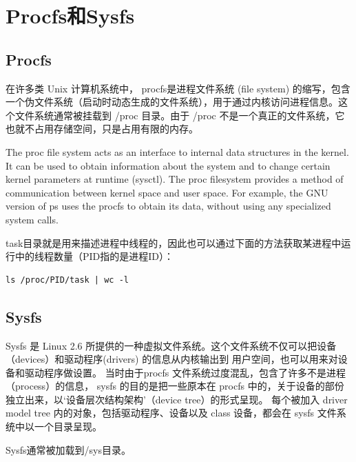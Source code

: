 \section{Procfs和Sysfs}

\subsection{Procfs}
在许多类 Unix 计算机系统中， procfs是进程文件系统 (file system) 的缩写，包含一个伪文件系统（启动时动态生成的文件系统），用于通过内核访问进程信息。这个文件系统通常被挂载到 /proc 目录。由于 /proc 不是一个真正的文件系统，它也就不占用存储空间，只是占用有限的内存。

The proc file system acts as an interface to internal data structures in the kernel. It can be used to obtain information about the system and to change certain kernel parameters at runtime (sysctl).
The proc filesystem provides a method of communication between kernel space and user space. For example, the GNU version of ps uses the procfs to obtain its data, without using any specialized system calls.

task目录就是用来描述进程中线程的，因此也可以通过下面的方法获取某进程中运行中的线程数量（PID指的是进程ID）：
\begin{verbatim}
ls /proc/PID/task | wc -l
\end{verbatim}  


\subsection{Sysfs}
Sysfs 是 Linux 2.6 所提供的一种虚拟文件系统。这个文件系统不仅可以把设备（devices）和驱动程序(drivers) 的信息从内核输出到 用户空间，也可以用来对设备和驱动程序做设置。
当时由于procfs 文件系统过度混乱，包含了许多不是进程（process）的信息， sysfs 的目的是把一些原本在 procfs 中的，关于设备的部份独立出来，以‘设备层次结构架构’（device tree）的形式呈现。
每个被加入 driver model tree 内的对象，包括驱动程序、设备以及 class 设备，都会在 sysfs 文件系统中以一个目录呈现。

Sysfs通常被加载到/sys目录。

